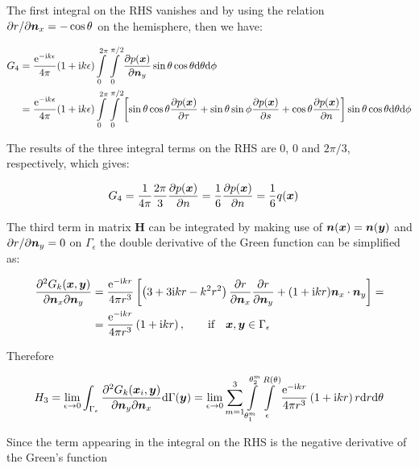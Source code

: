 \documentclass[a4paper, 10pt]{article}
\newcommand{\te}{\mathrm{e}}
\newcommand{\ti}{\mathrm{i}}
\newcommand{\td}{\mathrm{d}}
\newcommand{\tn}{\bm{\mathnormal{n}}}
\newcommand{\tx}{\bm{\mathnormal{x}}}
\newcommand{\ty}{\bm{\mathnormal{y}}}
\newcommand{\sx}{\bm{\mathnormal{x}}}
\newcommand{\sy}{\bm{\mathnormal{y}}}
\newcommand{\sn}{\bm{\mathnormal{n}}}
\newcommand{\bH}{\mathbf{H}}
\newcommand{\limeps}{\lim\limits_{\epsilon \rightarrow 0}}
\newcommand{\intsph}{\int\limits_{0}^{2\pi} \int\limits_{0}^{\pi/2}}
\newcommand{\dsph}{\mathrm{d}\theta \mathrm{d}\phi}
\newcommand{\summ}{\sum\limits_{m=1}^3}
\newcommand{\intme}{\int\limits_{\theta_1^m}^{\theta_2^m}\int\limits_\epsilon^{R(\theta)}}
\begin{document}
The first integral on the RHS vanishes and by using the relation $\partial r / \partial \sn_x = - \cos \theta$ on the hemisphere, then we have:

\begin{align}
	G_4 & = \frac{\te ^{-\ti k\epsilon}}{4 \pi} (1 + \ti k \epsilon) \intsph \frac{\partial p(\sx)}{\partial \sn_y} \sin \theta \cos \theta \dsph \nonumber \\
	& =  \frac{\te ^{-\ti k\epsilon}}{4 \pi} (1 + \ti k \epsilon) \intsph \left[ \sin \theta \cos \theta \frac{\partial p(\sx)}{\partial \tau} + \sin \theta \sin \phi \frac{\partial p(\sx)}{\partial s} + \cos\theta \frac{\partial p(\sx)}{\partial n} \right] \sin\theta \cos\theta \dsph
\end{align}

The results of the three integral terms on the RHS are $0$, $0$ and $2\pi / 3$, respectively, which gives:

\begin{align}
	G_4 & = \frac{1}{4\pi}\frac{2\pi}{3}\frac{\partial p(\sx)}{\partial n} = \frac{1}{6} \frac{\partial p(\sx)}{\partial n} = \frac{1}{6} q(\sx)
\end{align}

The third term in matrix $\bH$ can be integrated by making use of $\sn(\sx) = \sn(\sy)$ and $\partial r / \partial \sn_y = 0$ on $\Gamma_\epsilon$ the double derivative of the Green function can be simplified as:

\begin{align}
	\frac{\partial^2 G_k(\tx, \ty)}{\partial \tn_x \partial \tn_y}
	&= \frac{\te^{- \ti kr}}{4 \pi r^3}\left[\left(3 + 3 \ti kr - k^2 r^2\right) \frac{\partial r}{\partial \tn_x}\frac{\partial r}{\partial \tn_y} + (1 + \ti kr) \tn_x \cdot \tn_y \right] = \nonumber\\
	& = \frac{\te^{- \ti kr}}{4 \pi r^3}\left(1 + \ti kr\right),  \qquad \text{if} \quad \sx, \sy \in \Gamma_\epsilon
\end{align}

Therefore

\begin{align}
	H_3 = \limeps \int_{\Gamma_\epsilon} \frac{\partial^2{G}_k (\sx_i, \sy)}{\partial \sn_y \partial \sn_x} \td \Gamma(\sy) & =
	\limeps \summ \intme \frac{\te^{- \ti kr}}{4 \pi r^3}\left(1 + \ti kr\right) r \mathrm{d} r \mathrm{d} \theta \nonumber \\
\end{align}

Since the term appearing in the integral on the RHS is the negative derivative of the Green's function
\end{document}
